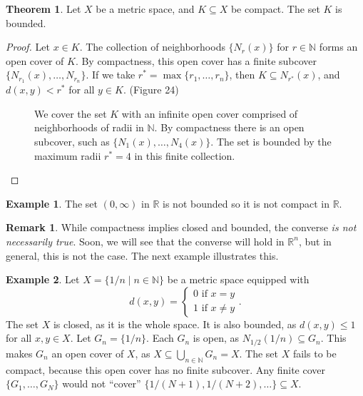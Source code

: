 \documentclass{article}
\newcommand{\N}{\mathbb{N}}
\newcommand{\R}{\mathbb{R}}
\theoremstyle{definition}
\newtheorem{theorem}{Theorem}[section]
\newtheorem{example}{Example}[section]
\newtheorem{remark}{Remark}[section]
\begin{document}
	\begin{theorem}
		Let $ X $ be a metric space, and $ K\subseteq X $ be compact. The set $ K $ is bounded. 
	\end{theorem}
	\begin{proof}
		Let $ x\in K $. The collection of neighborhoods $ \{N_r(x)\} $ for $ r\in\N $ forms an open cover of $ K $. By compactness, this open cover has a finite subcover $ \{N_{r_1}(x),\ldots,N_{r_n}\} $. If we take $ r^*=\max\{r_1,\ldots,r_n\} $, then $ K\subseteq N_{r^*}(x) $, and $ d(x,y)<r^* $ for all $ y\in K $. (Figure 24)
		\begin{figure}[h!]
			\centering
			\caption{We cover the set $ K $ with an infinite open cover comprised of neighborhoods of radii in $ \N $. By compactness there is an open subcover, such as $ \{N_1(x),\ldots,N_4(x)\} $. The set is bounded by the maximum radii $ r^*=4 $ in this finite collection.}  
		\end{figure}
	\end{proof}
	\begin{example}
		The set $ (0,\infty) $ in $ \R $ is not bounded so it is not compact in $ \R $. 
	\end{example}
	\begin{remark}
		While compactness implies closed and bounded, the converse \textit{is not necessarily true}. Soon, we will see that the converse will hold in $ \R^n $, but in general, this is not the case. The next example illustrates this.
	\end{remark}
	\begin{example}
		Let $ X=\{1/n\mid n\in\N\} $ be a metric space equipped with $$ d(x,y)=\begin{cases}
			0\text{ if }x=y\\1\text{ if }x\neq y
		\end{cases}.$$
		The set $ X $ is closed, as it is the whole space. It is also bounded, as $ d(x,y)\le 1 $ for all $ x,y\in X $. Let $ G_n=\{1/n\} $. Each $ G_n $ is open, as $ N_{1/2}(1/n)\subseteq G_n $. This makes $ G_n $ an open cover of $ X $, as $ X\subseteq\bigcup_{n\in \N} G_n=X $. The set $ X $ fails to be compact, because this open cover has no finite subcover. Any finite cover $ \{G_{1},\ldots,G_{N}\} $ would not ``cover''  $ \{1/(N+1),1/(N+2),\ldots\}\subseteq X $.	
	\end{example}
	
\end{document}
